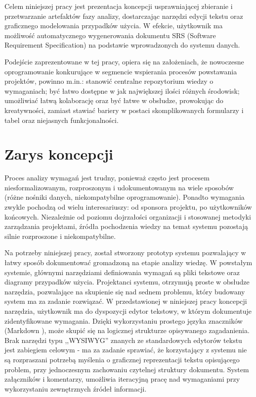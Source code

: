       Celem niniejszej pracy jest prezentacja koncepcji usprawniającej zbieranie i przetwarzanie artefaktów fazy analizy, dostarczając narzędzi edycji tekstu oraz graficznego modelowania przypadków użycia. W efekcie, użytkownik ma możliwość automatycznego wygenerowania dokumentu SRS (Software Requirement Specification) \cite{IEEE89} na podstawie wprowadzonych do systemu danych.
      
      Podejście zaprezentowane w tej pracy, opiera się na założeniach, że nowoczesne oprogramowanie konkurujące w segmencie wspierania procesów powstawania projektów, powinno m.in.: stanowić centralne repozytorium wiedzy o wymaganiach; być łatwo dostępne w jak największej ilości różnych środowisk; umożliwiać łatwą kolaborację oraz być łatwe w obsłudze, prowokując do kreatywności, zamiast stawiać bariery w postaci skomplikowanych formularzy i tabel oraz niejasnych funkcjonalności. 


    \section{Zarys koncepcji}

      Proces analizy wymagań jest trudny, ponieważ często jest procesem niesformalizowanym, rozproszonym i udokumentowanym na wiele sposobów (różne nośniki danych, niekompatybilne oprogramowanie). Ponadto wymagania zwykle pochodzą od wielu interesariuszy: od sponsora projektu, po użytkowników końcowych. Niezależnie od poziomu dojrzałości organizacji i stosowanej metodyki zarządzania projektami, źródła pochodzenia wiedzy na temat systemu pozostają silnie rozproszone i niekompatybilne. 

      Na potrzeby niniejszej pracy, został stworzony prototyp systemu pozwalający w łatwy sposób dokumentować gromadzoną na etapie analizy wiedzę. W powstałym systemie, głównymi narzędziami definiowania wymagań są pliki tekstowe oraz diagramy przypadków użycia. Projektanci systemu, otrzymują proste w obsłudze narzędzia, pozwalające na skupienie się nad sednem problemu, który budowany system ma za zadanie rozwiązać. W przedstawionej w niniejszej pracy koncepcji narzędzia, użytkownik ma do dyspozycji edytor tekstowy, w którym dokumentuje zidentyfikowane wymagania. Dzięki wykorzystaniu prostego języka znaczników (Markdown \cite{Grub04}), może skupić się na logicznej strukturze opisywanego zagadanienia. Brak narzędzi typu ,,WYSIWYG'' znanych ze standardowych edytorów tekstu jest zabiegiem celowym - ma za zadanie sprawiać, że korzystający z systemu nie są rozpraszani potrzebą myślenia o graficznej reprezentacji tekstu opisującego problem, przy jednoczesnym zachowaniu czytelnej struktury dokumentu. System załączników i komentarzy, umożliwia iteracyjną pracę nad wymaganiami przy wykorzystaniu zewnętrznych źródeł informacji. 

